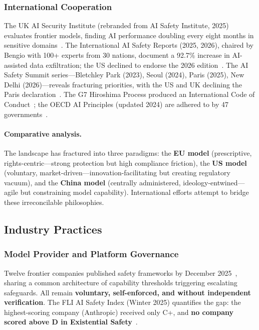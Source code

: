 \subsubsection{International Cooperation}
\label{sec:gov-intl}

The UK AI Security Institute (rebranded from AI Safety Institute, 2025) evaluates frontier models, finding AI performance doubling every eight months in sensitive domains~\cite{aisi2025trends}. The International AI Safety Reports (2025, 2026), chaired by Bengio with 100+ experts from 30 nations, document a 92.7\% increase in AI-assisted data exfiltration; the US declined to endorse the 2026 edition~\cite{aisafetyreport2025,aisafetyreport2026,time2026usretreat}. The AI Safety Summit series---Bletchley Park (2023), Seoul (2024), Paris (2025), New Delhi (2026)---reveals fracturing priorities, with the US and UK declining the Paris declaration~\cite{bletchley2023,seoul2024,paris2025}. The G7 Hiroshima Process produced an International Code of Conduct~\cite{hiroshima2023}; the OECD AI Principles (updated 2024) are adhered to by 47 governments~\cite{oecdai2024}.

\paragraph{Comparative analysis.}
The landscape has fractured into three paradigms: the \textbf{EU model} (prescriptive, rights-centric---strong protection but high compliance friction), the \textbf{US model} (voluntary, market-driven---innovation-facilitating but creating regulatory vacuum), and the \textbf{China model} (centrally administered, ideology-entwined---agile but constraining model capability). International efforts attempt to bridge these irreconcilable philosophies.


\subsection{Industry Practices}
\label{sec:gov-industry}

\subsubsection{Model Provider and Platform Governance}
\label{sec:gov-frameworks}

Twelve frontier companies published safety frameworks by December 2025~\cite{metr2025frameworks}, sharing a common architecture of capability thresholds triggering escalating safeguards. All remain \textbf{voluntary, self-enforced, and without independent verification}. The FLI AI Safety Index (Winter 2025) quantifies the gap: the highest-scoring company (Anthropic) received only C+, and \textbf{no company scored above D in Existential Safety}~\cite{fli2025winter}.

